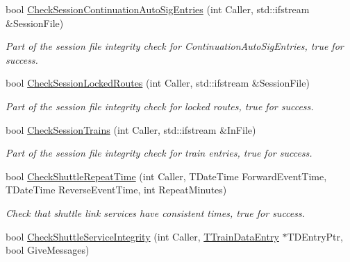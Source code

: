 \begin{DoxyCompactItemize}
\item 
\mbox{\label{class_t_train_controller_a96985493678231bbcad15b36c0c63579}} 
bool \mbox{\hyperlink{class_t_train_controller_a96985493678231bbcad15b36c0c63579}{Check\+Session\+Continuation\+Auto\+Sig\+Entries}} (int Caller, std\+::ifstream \&Session\+File)
\begin{DoxyCompactList}\small\item\em Part of the session file integrity check for Continuation\+Auto\+Sig\+Entries, true for success. \end{DoxyCompactList}\item 
\mbox{\label{class_t_train_controller_a4d5ebc5a4b6dda080840913822f3f238}} 
bool \mbox{\hyperlink{class_t_train_controller_a4d5ebc5a4b6dda080840913822f3f238}{Check\+Session\+Locked\+Routes}} (int Caller, std\+::ifstream \&Session\+File)
\begin{DoxyCompactList}\small\item\em Part of the session file integrity check for locked routes, true for success. \end{DoxyCompactList}\item 
\mbox{\label{class_t_train_controller_a53fb58a1ae6103601a24ad2162f86f58}} 
bool \mbox{\hyperlink{class_t_train_controller_a53fb58a1ae6103601a24ad2162f86f58}{Check\+Session\+Trains}} (int Caller, std\+::ifstream \&In\+File)
\begin{DoxyCompactList}\small\item\em Part of the session file integrity check for train entries, true for success. \end{DoxyCompactList}\item 
\mbox{\label{class_t_train_controller_afe4a83b3b7ba6daa955ce5617d509d51}} 
bool \mbox{\hyperlink{class_t_train_controller_afe4a83b3b7ba6daa955ce5617d509d51}{Check\+Shuttle\+Repeat\+Time}} (int Caller, T\+Date\+Time Forward\+Event\+Time, T\+Date\+Time Reverse\+Event\+Time, int Repeat\+Minutes)
\begin{DoxyCompactList}\small\item\em Check that shuttle link services have consistent times, true for success. \end{DoxyCompactList}\item 
bool \mbox{\hyperlink{class_t_train_controller_a161fe7b4bbf101fc0a3f7eadd3aff9ca}{Check\+Shuttle\+Service\+Integrity}} (int Caller, \mbox{\hyperlink{class_t_train_data_entry}{T\+Train\+Data\+Entry}} $\ast$T\+D\+Entry\+Ptr, bool Give\+Messages)

\end{DoxyCompactItemize}
